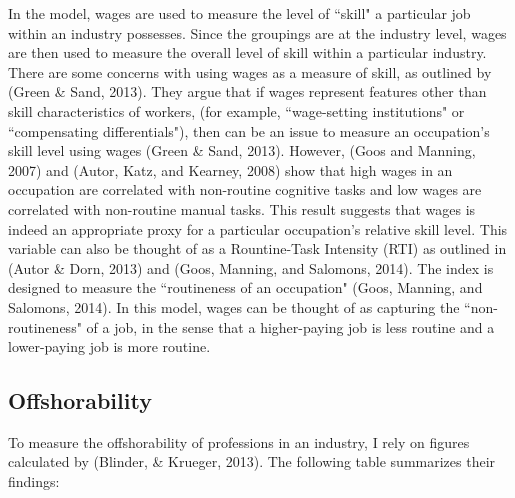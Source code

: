 \documentclass[12pt]{article}
\begin{document}
\begin{flushleft}
In the model, wages are used to measure the level of ``skill" a particular job within an industry possesses. Since the groupings are at the industry level, wages are then used to measure the overall level of skill within a particular industry.
\break
\linebreak
There are some concerns with using wages as a measure of skill, as outlined by (Green \& Sand, 2013). They argue that if wages represent features other than skill characteristics of workers, (for example, ``wage-setting institutions" or ``compensating differentials"), then can be an issue to measure an occupation's skill level using wages (Green \& Sand, 2013). However, (Goos and Manning, 2007) and (Autor, Katz, and Kearney, 2008) show that high wages in an occupation are correlated with non-routine cognitive tasks and low wages are correlated with non-routine manual tasks. This result suggests that wages is indeed an appropriate proxy for a particular occupation's relative skill level.
\break
\linebreak
This variable can also be thought of as a Rountine-Task Intensity (RTI) as outlined in (Autor \& Dorn, 2013) and (Goos, Manning, and Salomons, 2014). The index is designed to measure the ``routineness of an occupation" (Goos, Manning, and Salomons, 2014). In this model, wages can be thought of as capturing the ``non-routineness" of a job, in the sense that a higher-paying job is less routine and a lower-paying job is more routine.
\end{flushleft}

\newpage

\subsection{Offshorability}

To measure the offshorability of professions in an industry, I rely on figures calculated by (Blinder, \& Krueger, 2013). The following table summarizes their findings:
\end{document}
